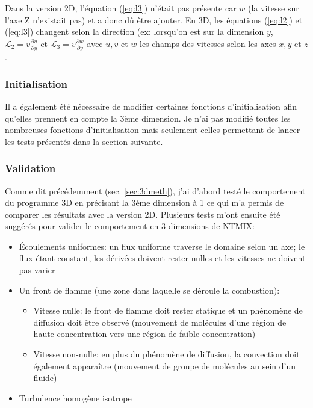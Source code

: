 Dans la version 2D, l'équation (\ref{eq:l3}) n'était pas présente car $w$ (la vitesse sur l'axe Z n'existait pas) et a donc dû être ajouter. En 3D, les équations (\ref{eq:l2}) et (\ref{eq:l3}) changent selon la direction (ex: lorsqu'on est sur la dimension $y$, $\mathcal{L}_2 = v \frac{\partial u}{\partial y}$ et $\mathcal{L}_3 = v \frac{\partial w}{\partial y}$ avec $u,v$ et $w$ les champs des vitesses selon les axes $x,y$ et $z$.

\subsubsection{Initialisation}Il a également été nécessaire de modifier certaines fonctions d'initialisation afin qu'elles prennent en compte la 3ème dimension. Je n'ai pas modifié toutes les nombreuses fonctions d'initialisation mais seulement celles permettant de lancer les tests présentés dans la section suivante.





\subsubsection{Validation}\label{sec:3D-validation}
Comme dit précédemment (sec. \ref{sec:3dmeth}), j'ai d'abord testé le comportement du programme 3D en précisant la 3éme dimension à 1 ce qui m'a permis de comparer les résultats avec la version 2D. Plusieurs tests m'ont ensuite été suggérés pour valider le comportement en 3 dimensions de NTMIX:

\begin{itemize}
\item Écoulements uniformes: un flux uniforme traverse le domaine selon un axe; le flux étant constant, les dérivées doivent rester nulles et les vitesses ne doivent pas varier
\item Un front de flamme (une zone dans laquelle se déroule la combustion):
  \begin{itemize}
  \item Vitesse nulle: le front de flamme doit rester statique et un phénomène de diffusion doit être observé (mouvement de molécules d'une région de haute concentration vers une région de faible concentration)
  \item Vitesse non-nulle: en plus du phénomène de diffusion, la convection doit également apparaître (mouvement de groupe de molécules au sein d'un fluide)
  \end{itemize}
\item Turbulence homogène isotrope
\end{itemize}

